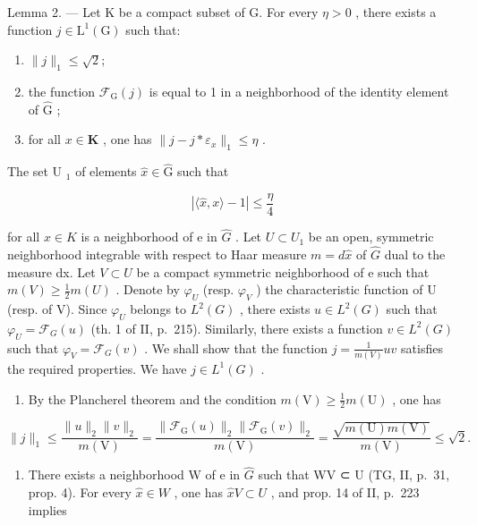 Lemma 2. --- Let K be a compact subset of G. For every \(\eta > 0\) , there exists a function \(j \in \mathrm{L}^{1}(\mathrm{G})\) such that:

\begin{enumerate}
\def\labelenumi{\alph{enumi})}
\item
  \(\|j\|_{1}\leqslant\sqrt{2};\)
\item
  the function \(\mathcal{F}_{\mathrm{G}}(j)\) is equal to 1 in a neighborhood of the identity element of \(\widehat{\mathrm{G}}\) ;
\item
  for all \(x \in \mathbf{K}\) , one has \(\| j - j * \varepsilon_x\|_1 \leqslant \eta\) .
\end{enumerate}

The set U \(_{1}\) of elements \(\widehat{x} \in \widehat{\mathrm{G}}\) such that

\[
| \langle \widehat {x}, x \rangle - 1 | \leqslant \frac {\eta}{4}
\]

 for all \(x \in K\) is a neighborhood of e in \(\hat{G}\) . Let \(U \subset U_{1}\) be an open, symmetric neighborhood integrable with respect to Haar measure \(m = d\hat{x}\) of \(\hat{G}\) dual to the measure dx. Let \(V \subset U\) be a compact symmetric neighborhood of e such that \(m(V) \geqslant \frac{1}{2}m(U)\) . Denote by \(\varphi_{U}\) (resp. \(\varphi_{V}\) ) the characteristic function of U (resp. of V). Since \(\varphi_{U}\) belongs to \(L^{2}(G)\) , there exists \(u \in L^{2}(G)\) such that \(\varphi_{U} = \mathcal{F}_{G}(u)\) (th. 1 of II, p.~215). Similarly, there exists a function \(v \in L^{2}(G)\) such that \(\varphi_{V} = \mathcal{F}_{G}(v)\) . We shall show that the function \(j = \frac{1}{m(V)}uv\) satisfies the required properties. We have \(j \in L^{1}(G)\) .

\begin{enumerate}
\def\labelenumi{\alph{enumi})}
\tightlist
\item
  By the Plancherel theorem and the condition \(m(\mathrm{V}) \geqslant \frac{1}{2}m(\mathrm{U})\) , one has
\end{enumerate}

\[
\| j \| _ {1} \leqslant \frac {\| u \| _ {2} \| v \| _ {2}}{m (\mathrm{V})} = \frac {\| \mathcal {F} _ {\mathrm{G}} (u) \| _ {2} \| \mathcal {F} _ {\mathrm{G}} (v) \| _ {2}}{m (\mathrm{V})} = \frac {\sqrt {m (\mathrm{U}) m (\mathrm{V})}}{m (\mathrm{V})} \leqslant \sqrt {2}.
\]

\begin{enumerate}
\def\labelenumi{\alph{enumi})}
\setcounter{enumi}{1}
\tightlist
\item
  There exists a neighborhood W of e in \(\widehat{G}\) such that WV ⊂ U (TG, II, p.~31, prop. 4). For every \(\widehat{x} \in W\) , one has \(\widehat{x}V \subset U\) , and prop. 14 of II, p.~223 implies
\end{enumerate}


